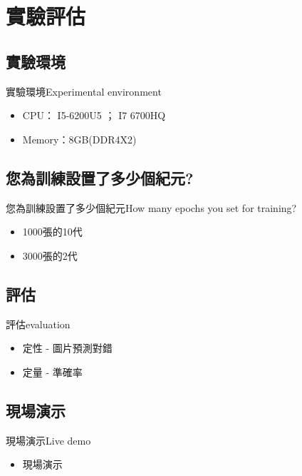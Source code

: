 \documentclass[utf8x]{beamer}
\begin{document}
\section{實驗評估}
\subsection{實驗環境}
\begin{frame}{實驗環境}{Experimental environment}
 \begin{itemize}
  \item {
    CPU： I5-6200U5 ； I7 6700HQ
  }
\item {
    Memory：8GB(DDR4X2)
  }
  \end{itemize}
\end{frame}
\subsection{您為訓練設置了多少個紀元?}
\begin{frame}{您為訓練設置了多少個紀元}{How many epochs you set for training?}
 \begin{itemize}
  \item {
    1000張的10代
  }
\item {
    3000張的2代
  }
  \end{itemize}
\end{frame}
\subsection{評估}
\begin{frame}{評估}{evaluation}
 \begin{itemize}
  \item {
    定性 - 圖片預測對錯
  }
\item {
    定量 - 準確率
  }
  \end{itemize}
\end{frame}
\subsection{現場演示}
\begin{frame}{現場演示}{Live demo}
  \begin{itemize}
  \item {
    現場演示
  }
  \end{itemize}
\end{frame}
\end{document}
